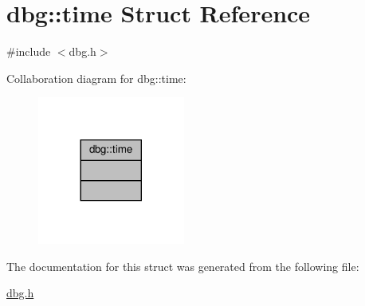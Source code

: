 \hypertarget{structdbg_1_1time}{}\section{dbg\+:\+:time Struct Reference}
\label{structdbg_1_1time}


{\ttfamily \#include $<$dbg.\+h$>$}



Collaboration diagram for dbg\+:\+:time\+:\nopagebreak
\begin{figure}[H]
\begin{center}
\leavevmode
\includegraphics[width=137pt]{d8/d06/structdbg_1_1time__coll__graph}
\end{center}
\end{figure}


The documentation for this struct was generated from the following file\+:\begin{DoxyCompactItemize}
\item 
\hyperlink{dbg_8h}{dbg.\+h}\end{DoxyCompactItemize}
